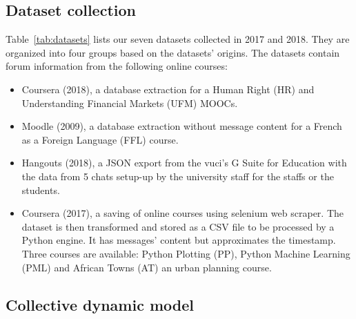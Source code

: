 \documentclass[a4paper,twoside]{article}
\begin{document}
\subsection{Dataset collection}
Table~\ref{tab:datasets} lists our seven datasets collected in 2017 and 2018.  They are organized into four groups based on the datasets' origins.
The datasets contain forum information from the following online courses:
\begin{itemize}
\item Coursera (2018), a database extraction for a Human Right (HR) and Understanding Financial Markets (UFM) MOOCs.
\item Moodle (2009), a database extraction without message content for a French as a Foreign Language (FFL) course.
\item Hangouts (2018), a JSON export from the \gls{vuci}'s G Suite for Education with the data from 5 chats setup-up by the university staff for the staffs or the students.
\item Coursera (2017), a saving of online courses using selenium web scraper.  The dataset is then transformed and stored as a CSV file to be processed by a Python engine.  It has messages' content but approximates the timestamp.  Three courses are available: Python Plotting (PP), Python Machine Learning (PML) and African Towns (AT) an urban planning course.
\end{itemize}

\subsection{Collective dynamic model}
\end{document}
